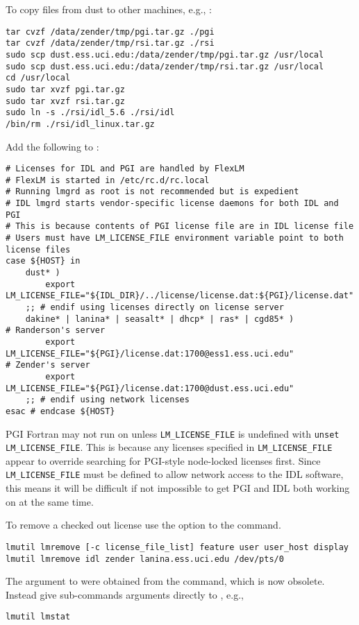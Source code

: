 \documentclass[12pt,twoside]{article}
\begin{document}
To copy files from dust to other machines, e.g., :
\begin{verbatim}
tar cvzf /data/zender/tmp/pgi.tar.gz ./pgi
tar cvzf /data/zender/tmp/rsi.tar.gz ./rsi
sudo scp dust.ess.uci.edu:/data/zender/tmp/pgi.tar.gz /usr/local
sudo scp dust.ess.uci.edu:/data/zender/tmp/rsi.tar.gz /usr/local
cd /usr/local
sudo tar xvzf pgi.tar.gz
sudo tar xvzf rsi.tar.gz
sudo ln -s ./rsi/idl_5.6 ./rsi/idl
/bin/rm ./rsi/idl_linux.tar.gz
\end{verbatim}

Add the following to :
\begin{verbatim}
# Licenses for IDL and PGI are handled by FlexLM
# FlexLM is started in /etc/rc.d/rc.local
# Running lmgrd as root is not recommended but is expedient
# IDL lmgrd starts vendor-specific license daemons for both IDL and PGI
# This is because contents of PGI license file are in IDL license file
# Users must have LM_LICENSE_FILE environment variable point to both license files
case ${HOST} in
    dust* )
        export LM_LICENSE_FILE="${IDL_DIR}/../license/license.dat:${PGI}/license.dat"
    ;; # endif using licenses directly on license server
    dakine* | lanina* | seasalt* | dhcp* | ras* | cgd85* )
# Randerson's server
        export LM_LICENSE_FILE="${PGI}/license.dat:1700@ess1.ess.uci.edu"
# Zender's server
        export LM_LICENSE_FILE="${PGI}/license.dat:1700@dust.ess.uci.edu"
    ;; # endif using network licenses
esac # endcase ${HOST}
\end{verbatim}
PGI Fortran may not run on  unless \verb'LM_LICENSE_FILE'
is undefined with \verb'unset LM_LICENSE_FILE'.
This is because any licenses specified in \verb'LM_LICENSE_FILE'
appear to override searching for PGI-style node-locked licenses first.
Since \verb'LM_LICENSE_FILE' must be defined to allow network access
to the IDL software, this means it will be difficult if not impossible
to get PGI and IDL both working on  at the same time.

To remove a checked out license use the  option to
the  command.
\begin{verbatim}
lmutil lmremove [-c license_file_list] feature user user_host display
lmutil lmremove idl zender lanina.ess.uci.edu /dev/pts/0
\end{verbatim}
The argument to  were obtained from the
 command, which is now obsolete.
Instead give sub-commands arguments directly to , e.g.,
\begin{verbatim}
lmutil lmstat
\end{verbatim}
\end{document}
